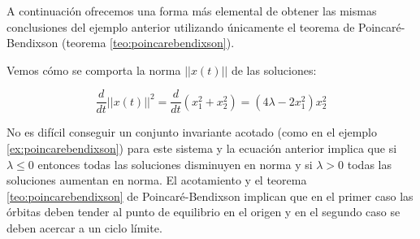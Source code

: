 A continuación ofrecemos una forma más elemental de obtener las mismas conclusiones del ejemplo anterior utilizando únicamente el teorema de Poincaré-Bendixson (teorema \ref{teo:poincarebendixson}).

\begin{example}
Vemos cómo se comporta la norma $||x(t)||$ de las soluciones:

$$
	\dfrac{d}{dt} ||x(t)||^2 = \dfrac{d}{dt}(x_1^2 + x_2^2) = (4\lambda - 2x_1^2)x_2^2
$$

No es difícil conseguir un conjunto invariante acotado (como en el ejemplo \ref{ex:poincarebendixson}) para este sistema y la ecuación anterior implica que si $\lambda \leq 0$ entonces todas las soluciones disminuyen en norma y si $\lambda > 0$ todas las soluciones aumentan en norma.
El acotamiento y el teorema \ref{teo:poincarebendixson} de Poincaré-Bendixson implican que en el primer caso las órbitas deben tender al punto de equilibrio en el origen y en el segundo caso se deben acercar a un ciclo límite.
\end{example}

